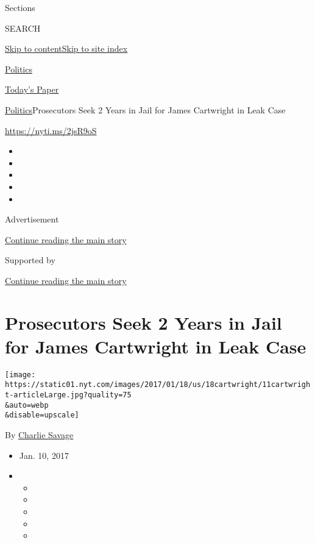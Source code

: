 Sections

SEARCH

\protect\hyperlink{site-content}{Skip to
content}\protect\hyperlink{site-index}{Skip to site index}

\href{https://www.nytimes.com/section/politics}{Politics}

\href{https://myaccount.nytimes.com/auth/login?response_type=cookie\&client_id=vi}{}

\href{https://www.nytimes.com/section/todayspaper}{Today's Paper}

\href{/section/politics}{Politics}\textbar{}Prosecutors Seek 2 Years in
Jail for James Cartwright in Leak Case

\url{https://nyti.ms/2jsR9oS}

\begin{itemize}
\item
\item
\item
\item
\item
\end{itemize}

Advertisement

\protect\hyperlink{after-top}{Continue reading the main story}

Supported by

\protect\hyperlink{after-sponsor}{Continue reading the main story}

\hypertarget{prosecutors-seek-2-years-in-jail-for-james-cartwright-in-leak-case}{%
\section{Prosecutors Seek 2 Years in Jail for James Cartwright in Leak
Case}\label{prosecutors-seek-2-years-in-jail-for-james-cartwright-in-leak-case}}

\texttt{[image: https://static01.nyt.com/images/2017/01/18/us/18cartwright/11cartwright-articleLarge.jpg?quality=75\\\&auto=webp\\\&disable=upscale]}

By \href{http://www.nytimes.com/by/charlie-savage}{Charlie Savage}

\begin{itemize}
\item
  Jan. 10, 2017
\item
  \begin{itemize}
  \item
  \item
  \item
  \item
  \item
  \end{itemize}
\end{itemize}

